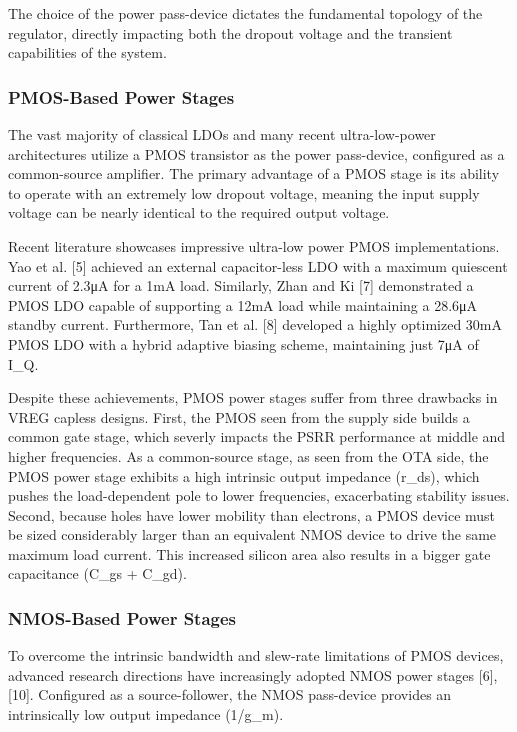 \documentclass[
]{article}
\begin{document}
The choice of the power pass-device dictates the fundamental topology of
the regulator, directly impacting both the dropout voltage and the
transient capabilities of the system.

\subsubsection{PMOS-Based Power Stages}\label{_pmos_based_power_stages}

The vast majority of classical LDOs and many recent ultra-low-power
architectures utilize a PMOS transistor as the power pass-device,
configured as a common-source amplifier. The primary advantage of a PMOS
stage is its ability to operate with an extremely low dropout voltage,
meaning the input supply voltage can be nearly identical to the required
output voltage.

Recent literature showcases impressive ultra-low power PMOS
implementations. Yao et al. {[}5{]} achieved an external capacitor-less
LDO with a maximum quiescent current of 2.3μA for a 1mA load. Similarly,
Zhan and Ki {[}7{]} demonstrated a PMOS LDO capable of supporting a 12mA
load while maintaining a 28.6μA standby current. Furthermore, Tan et al.
{[}8{]} developed a highly optimized 30mA PMOS LDO with a hybrid
adaptive biasing scheme, maintaining just 7μA of I\_Q.

Despite these achievements, PMOS power stages suffer from three
drawbacks in VREG capless designs. First, the PMOS seen from the supply
side builds a common gate stage, which severly impacts the PSRR
performance at middle and higher frequencies. As a common-source stage,
as seen from the OTA side, the PMOS power stage exhibits a high
intrinsic output impedance (r\_ds), which pushes the load-dependent pole
to lower frequencies, exacerbating stability issues. Second, because
holes have lower mobility than electrons, a PMOS device must be sized
considerably larger than an equivalent NMOS device to drive the same
maximum load current. This increased silicon area also results in a
bigger gate capacitance (C\_gs + C\_gd).

\subsubsection{NMOS-Based Power Stages}\label{_nmos_based_power_stages}

To overcome the intrinsic bandwidth and slew-rate limitations of PMOS
devices, advanced research directions have increasingly adopted NMOS
power stages {[}6{]}, {[}10{]}. Configured as a source-follower, the
NMOS pass-device provides an intrinsically low output impedance
(1/g\_m).
\end{document}
